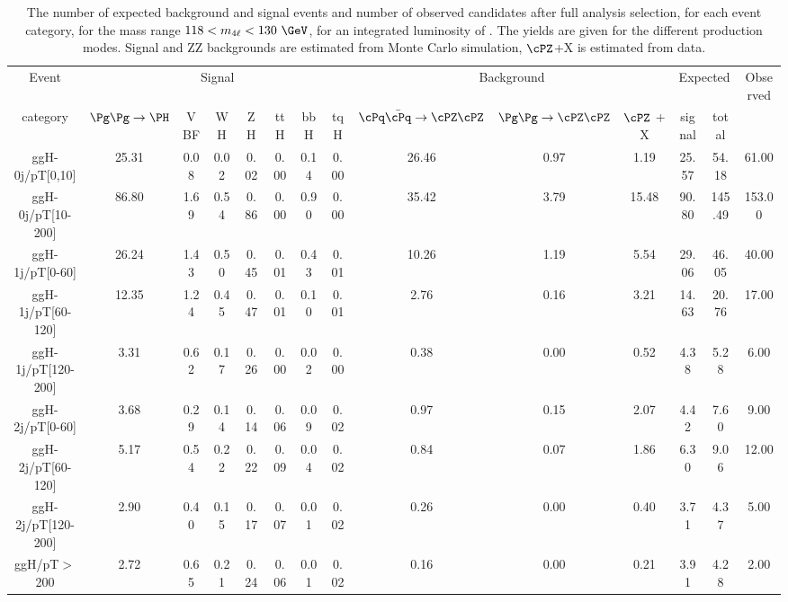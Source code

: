 \begin{table}[htb]
	\begin{center}
		\small
		\caption{The number of expected background and signal events and number of observed candidates after full analysis selection, for each event category, for the mass range $118<\mllll<130~\GeV$, for an integrated luminosity of \usedLumiABC.
			The yields are given for the different production modes.
			Signal and ZZ backgrounds are estimated from Monte Carlo simulation, 
			$\cPZ$+X is estimated from data.
			\label{tab:EventYieldsPeakCateg}}
		\resizebox{\textwidth}{!}
		{
				\begin{tabular}{cccccccc|ccc|cc|c}
				\hline
				\hline
				Event & \multicolumn{7}{c|}{Signal} & \multicolumn{3}{c|}{Background} &  \multicolumn{2}{c|}{Expected} & Observed \\
				category             & $\ggH$ &VBF    &WH    &ZH    &ttH   &bbH   &tqH   &$\qqZZ$  &$\ggZZ$   &$\cPZ$ + X  &signal&total& \\
				\hline
				ggH-0j/pT[0,10]      &25.31  &0.08  &0.02  &0.02  &0.00  &0.14  &0.00  &26.46  &0.97  &1.19    &25.57  &54.18   &61.00   \\
				ggH-0j/pT[10-200]    &86.80  &1.69  &0.54  &0.86  &0.00  &0.90  &0.00  &35.42  &3.79  &15.48   &90.80  &145.49  &153.00  \\
				ggH-1j/pT[0-60]      &26.24  &1.43  &0.50  &0.45  &0.01  &0.43  &0.01  &10.26  &1.19  &5.54    &29.06  &46.05   &40.00   \\
				ggH-1j/pT[60-120]    &12.35  &1.24  &0.45  &0.47  &0.01  &0.10  &0.01  &2.76   &0.16  &3.21    &14.63  &20.76   &17.00   \\
				ggH-1j/pT[120-200]   &3.31   &0.62  &0.17  &0.26  &0.00  &0.02  &0.00  &0.38   &0.00  &0.52    &4.38   &5.28    &6.00    \\
				ggH-2j/pT[0-60]      &3.68   &0.29  &0.14  &0.14  &0.06  &0.09  &0.02  &0.97   &0.15  &2.07    &4.42   &7.60    &9.00    \\
				ggH-2j/pT[60-120]    &5.17   &0.54  &0.22  &0.22  &0.09  &0.04  &0.02  &0.84   &0.07  &1.86    &6.30   &9.06    &12.00   \\
				ggH-2j/pT[120-200]   &2.90   &0.40  &0.15  &0.17  &0.07  &0.01  &0.02  &0.26   &0.00  &0.40    &3.71   &4.37    &5.00    \\
				ggH/pT$>$200         &2.72   &0.65  &0.21  &0.24  &0.06  &0.01  &0.02  &0.16   &0.00  &0.21    &3.91   &4.28    &2.00    \\

\end{tabular}}
\end{center}
\end{table}
